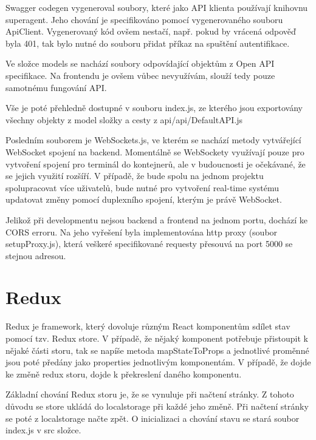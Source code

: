 \documentclass[a4paper,oneside,12pt]{report}
\begin{document}
Swagger codegen vygeneroval soubory, které jako API klienta používají knihovnu superagent.
Jeho chování je specifikováno pomocí vygenerovaného souboru ApiClient.
Vygenerovaný kód ovšem nestačí, např. pokud by vrácená odpověď byla 401, tak bylo nutné do souboru přidat příkaz na spuštění autentifikace.

Ve složce models se nachází soubory odpovídající objektům z Open API specifikace.
Na frontendu je ovšem vůbec nevyužívám, slouží tedy pouze samotnému fungování API.

Vše je poté přehledně dostupné v souboru index.js, ze kterého jsou exportovány všechny objekty z model složky a cesty z api/api/DefaultAPI.js

Posledním souborem je WebSockets.js, ve kterém se nachází metody vytvářející WebSocket spojení na backend.
Momentálně se WebSockety využívají pouze pro vytvoření spojení pro terminál do kontejnerů, ale v budoucnosti je očekávané, že se jejich využití rozšíří.
V případě, že bude spolu na jednom projektu spolupracovat více uživatelů, bude nutné pro vytvoření real-time systému updatovat změny pomocí duplexního spojení, kterým je právě WebSocket.

Jelikož při developmentu nejsou backend a frontend na jednom portu, dochází ke CORS erroru.
Na jeho vyřešení byla implementována http proxy (soubor setupProxy.js), která veškeré specifikované requesty přesouvá na port 5000 se stejnou adresou.

\section{Redux}

Redux je framework, který dovoluje různým React komponentům sdílet stav pomocí tzv. Redux store.
V případě, že nějaký komponent potřebuje přistoupit k nějaké části storu, tak se napíše metoda mapStateToProps a jednotlivé proměnné jsou poté předány jako properties jednotlivým komponentám.
V případě, že dojde ke změně redux storu, dojde k překreslení daného komponentu.


Základní chování Redux storu je, že se vynuluje při načtení stránky.
Z tohoto důvodu se store ukládá do localstorage při každé jeho změně.
Při načtení stránky se poté z localstorage načte zpět.
O inicializaci a chování stavu se stará soubor index.js v src složce.
\end{document}
